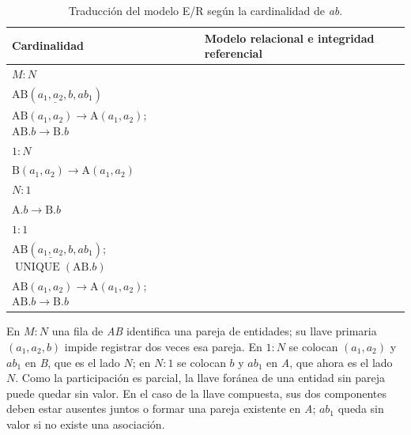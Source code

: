 \begin{table}[htbp]
  \centering
  \caption{Traducción del modelo E/R según la cardinalidad de \emph{ab}.}
  \label{tab:ej3-traduccion}
  \small
  \begin{tabularx}{\textwidth}{@{}l >{\raggedright\arraybackslash}X@{}}
    \toprule
    \textbf{Cardinalidad} & \textbf{Modelo relacional e integridad referencial} \\
    \midrule
    $M:N$ &
      \begin{tabular}[t]{@{}l@{}}
        $\mathrm{A}(\underline{a_1,a_2},a_3)$;
        $\mathrm{B}(\underline{b},b_1)$ \\
        $\mathrm{AB}(\underline{a_1,a_2,b},ab_1)$ \\
        $\mathrm{AB}(a_1,a_2)\to\mathrm{A}(a_1,a_2)$;
        $\mathrm{AB}.b\to\mathrm{B}.b$
      \end{tabular} \\
    $1:N$ &
      \begin{tabular}[t]{@{}l@{}}
        $\mathrm{A}(\underline{a_1,a_2},a_3)$;
        $\mathrm{B}(\underline{b},b_1,ab_1,a_1,a_2)$ \\
        $\mathrm{B}(a_1,a_2)\to\mathrm{A}(a_1,a_2)$
      \end{tabular} \\
    $N:1$ &
      \begin{tabular}[t]{@{}l@{}}
        $\mathrm{A}(\underline{a_1,a_2},a_3,ab_1,b)$;
        $\mathrm{B}(\underline{b},b_1)$ \\
        $\mathrm{A}.b\to\mathrm{B}.b$
      \end{tabular} \\
    $1:1$ &
      \begin{tabular}[t]{@{}l@{}}
        $\mathrm{A}(\underline{a_1,a_2},a_3)$;
        $\mathrm{B}(\underline{b},b_1)$ \\
        $\mathrm{AB}(\underline{a_1,a_2},b,ab_1)$;
        $\operatorname{UNIQUE}(\mathrm{AB}.b)$ \\
        $\mathrm{AB}(a_1,a_2)\to\mathrm{A}(a_1,a_2)$;
        $\mathrm{AB}.b\to\mathrm{B}.b$
      \end{tabular} \\
    \bottomrule
  \end{tabularx}
\end{table}

En $M:N$ una fila de \emph{AB} identifica una pareja de entidades; su llave
primaria $(a_1,a_2,b)$ impide registrar dos veces esa pareja. En $1:N$ se
colocan $(a_1,a_2)$ y $ab_1$ en \emph{B}, que es el lado $N$; en $N:1$ se
colocan $b$ y $ab_1$ en \emph{A}, que ahora es el lado $N$. Como la
participación es parcial, la llave foránea de una entidad sin pareja puede
quedar sin valor. En el caso de la llave compuesta, sus dos componentes deben
estar ausentes juntos o formar una pareja existente en \emph{A}; $ab_1$ queda
sin valor si no existe una asociación.

